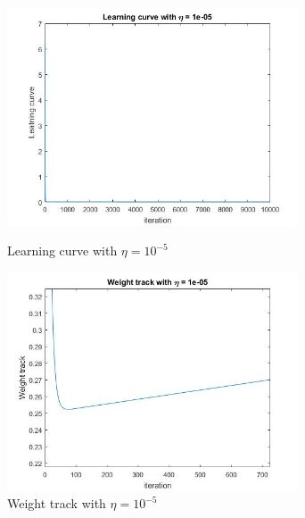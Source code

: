 \documentclass[a4paper]{article}
\begin{document}
\begin{spacing}{2.0}
	\begin{figure}[H]
	    \begin{minipage}[t]{0.5\textwidth}
	        \centering
	        \includegraphics[width=3.4in]{LC_5.jpg}
	        \caption{Learning curve with $\eta = 10^{-5}$}
	        \label{fig:side:a}
	    \end{minipage}%
	  \begin{minipage}[t]{0.5\textwidth}
	      \centering
	      \includegraphics[width=3.4in]{WT_5.jpg}
	      \caption{Weight track with $\eta = 10^{-5}$}
	      \label{fig:side:b}
	    \end{minipage}
	\end{figure}
	

\end{spacing}
\end{document}

